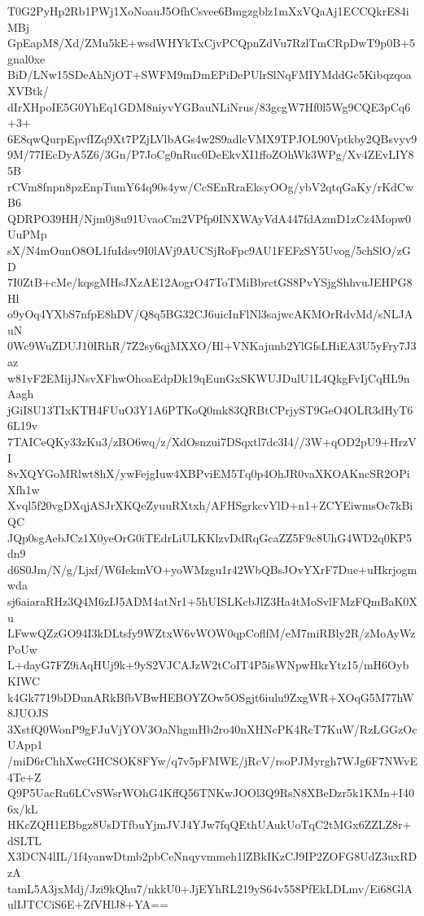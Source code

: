 T0G2PyHp2Rb1PWj1XoNoauJ5OfhCsvee6Bmgzgblz1mXxVQaAj1ECCQkrE84iMBj
GpEapM8/Xd/ZMu5kE+wsdWHYkTxCjvPCQpnZdVu7RzlTmCRpDwT9p0B+5gnal0xe
BiD/LNw15SDeAhNjOT+SWFM9mDmEPiDePUlrSlNqFMIYMddGc5KibqzqoaXVBtk/
dIrXHpoIE5G0YhEq1GDM8niyvYGBauNLiNrus/83gcgW7Hf0l5Wg9CQE3pCq6+3+
6E8qwQurpEpvfIZq9Xt7PZjLVlbAGs4w2S9adlcVMX9TPJOL90Vptkby2QBsvyv9
9M/77IEcDyA5Z6/3Gn/P7JoCg0nRuc0DeEkvXI1ffoZOhWk3WPg/Xv4ZEvLIY85B
rCVm8fnpn8pzEnpTumY64q90s4yw/CcSEnRraEksyOOg/ybV2qtqGaKy/rKdCwB6
QDRPO39HH/Njm0j8u91UvaoCm2VPfp0INXWAyVdA447fdAzmD1zCz4Mopw0UuPMp
sX/N4mOunO8OL1fuIdsv9I0lAVj9AUCSjRoFpc9AU1FEFzSY5Uvog/5chSlO/zGD
7I0ZtB+cMe/kqsgMHsJXzAE12AogrO47ToTMiBbrctGS8PvYSjgShhvuJEHPG8Hl
o9yOq4YXbS7nfpE8hDV/Q8q5BG32CJ6uicInFlNl3sajwcAKMOrRdvMd/sNLJAuN
0Wc9WuZDUJ10IRhR/7Z2sy6qjMXXO/Hl+VNKajunb2YlGfsLHiEA3U5yFry7J3az
w81vF2EMijJNsvXFhwOhoaEdpDk19qEunGxSKWUJDulU1L4QkgFvIjCqHL9nAagh
jGiI8U13TIxKTH4FUuO3Y1A6PTKoQ0mk83QRBtCPrjyST9GeO4OLR3dHyT66L19v
7TAICeQKy33zKu3/zBO6wq/z/XdOsnzui7DSqxtl7dc3I4//3W+qOD2pU9+HrzVI
8vXQYGoMRlwt8hX/ywFejgIuw4XBPviEM5Tq0p4OhJR0vaXKOAKncSR2OPiXfh1w
Xvql5f20vgDXqjASJrXKQeZyuuRXtxh/AFHSgrkcvYlD+n1+ZCYEiwmsOc7kBiQC
JQp0sgAebJCz1X0yeOrG0iTEdrLiULKKlzvDdRqGcaZZ5F9c8UhG4WD2q0KP5dn9
d6S0Jm/N/g/Ljxf/W6IekmVO+yoWMzgu1r42WbQBsJOvYXrF7Due+uHkrjogmwda
sj6aiaraRHz3Q4M6zIJ5ADM4atNr1+5hUISLKcbJlZ3Ha4tMoSvlFMzFQmBaK0Xu
LFwwQZzGO94I3kDLtsfy9WZtxW6vWOW0qpCoflfM/eM7miRBly2R/zMoAyWzPoUw
L+dayG7FZ9iAqHUj9k+9yS2VJCAJzW2tCoIT4P5isWNpwHkrYtz15/mH6OybKIWC
k4Gk7719bDDunARkBfbVBwHEBOYZOw5OSgjt6iulu9ZxgWR+XOqG5M77hW8JUOJS
3XstfQ0WonP9gFJuVjYOV3OaNhgmHb2ro40nXHNcPK4RcT7KuW/RzLGGzOcUApp1
/miD6rChhXwcGHCSOK8FYw/q7v5pFMWE/jRcV/rsoPJMyrgh7WJg6F7NWvE4Te+Z
Q9P5UacRu6LCvSWsrWOhG4KffQ56TNKwJOOl3Q9RsN8XBeDzr5k1KMn+I406x/kL
HKcZQH1EBbgz8UsDTfbuYjmJVJ4YJw7fqQEthUAukUoTqC2tMGx6ZZLZ8r+dSLTL
X3DCN4lIL/1f4yanwDtmb2pbCeNnqyvmmeh1lZBkIKzCJ9IP2ZOFG8UdZ3uxRDzA
tamL5A3jxMdj/Jzi9kQhu7/nkkU0+JjEYhRL219yS64v558PfEkLDLmv/Ei68GlA
ulIJTCCiS6E+ZfVHlJ8+YA==
